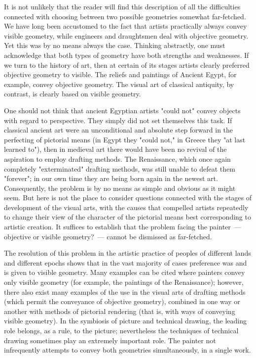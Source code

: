 It is not unlikely that the reader will find this description of all the difficulties
connected with choosing between two possible geometries somewhat far-fetched. We
have long been accustomed to the fact that artists practically always convey visible
geometry, while engineers and draughtsmen deal with objective geometry. Yet this was
by no means always the case. Thinking abstractly, one must acknowledge that both
types of geometry have both strengths and weaknesses. If we turn to the history of art,
then at certain of its stages artists clearly preferred objective geometry to visible. The
reliefs and paintings of Ancient Egypt, for example, convey objective geometry. The
visual art of classical antiquity, by contrast, is clearly based on visible geometry.

One should not think that ancient Egyptian artists "could not" convey objects with
regard to perspective. They simply did not set themselves this task. If classical ancient art
were an unconditional and absolute step forward in the perfecting of pictorial means (in
Egypt they "could not," in Greece they "at last learned to"), then in medieval art there
would have been no revival of the aspiration to employ drafting methods. The
Renaissance, which once again completely "exterminated" drafting methods, was still
unable to defeat them "forever"; in our own time they are being born again in the newest
art. Consequently, the problem is by no means as simple and obvious as it might seem.
But here is not the place to consider questions connected with the stages of development
of the visual arts, with the causes that compelled artists repeatedly to change their view
of the character of the pictorial means best corresponding to artistic creation. It suffices
to establish that the problem facing the painter~--- objective or visible geometry?~--- cannot
be dismissed as far-fetched.


The resolution of this problem in the artistic practice of peoples of different lands and
different epochs shows that in the vast majority of cases preference was and is given to
visible geometry. Many examples can be cited where painters convey only visible
geometry (for example, the paintings of the Renaissance); however, there also exist many
examples of the use in the visual arts of drafting methods (which permit the conveyance
of objective geometry), combined in one way or another with methods of pictorial
rendering (that is, with ways of conveying visible geometry). In the symbiosis of picture
and technical drawing, the leading role belongs, as a rule, to the picture; nevertheless
the techniques of technical drawing sometimes play an extremely important role. The
painter not infrequently attempts to convey both geometries simultaneously, in a single
work.

